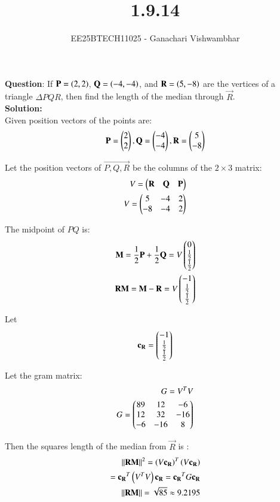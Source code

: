 \documentclass[journal]{IEEEtran}
\begin{document}
\title{1.9.14}
\author{EE25BTECH11025 - Ganachari Vishwambhar}
\maketitle

\textbf{Question}:\newline
If $\mathbf{P}=\left(2,2\right)$, $\mathbf{Q}=\left(-4,-4\right)$, and $\mathbf{R}=\left(5,-8\right)$ are the vertices of a triangle $\Delta PQR$, then find the length of the median through $\vec{R}$.\\
\textbf{Solution: }\\
Given position vectors of the points are:
\begin{align}
    \mathbf{P}=\begin{pmatrix}2\\2\end{pmatrix},
    \mathbf{Q}=\begin{pmatrix}-4\\-4\end{pmatrix},
    \mathbf{R}=\begin{pmatrix}5\\-8\end{pmatrix}
\end{align}

Let the position vectors of $\vec{P,Q,R}$ be the columns of the $2\times 3$ matrix:
\begin{align}
    V=\begin{pmatrix}\mathbf{R}&\mathbf{Q}&\mathbf{P}\end{pmatrix}\\
    V=\begin{pmatrix}5&-4&2\\-8&-4&2\end{pmatrix}
\end{align}

The midpoint of $PQ$ is:
\begin{align}
    \mathbf{M}=\frac{1}{2}\mathbf{P}+\frac{1}{2}\mathbf{Q}=V\begin{pmatrix}0\\ \frac{1}{2}\\ \frac{1}{2}\end{pmatrix}\\
    \mathbf{RM}=\mathbf{M}-\mathbf{R}=V\begin{pmatrix}-1\\ \frac{1}{2}\\ \frac{1}{2}\end{pmatrix}
\end{align}

Let
\begin{align}
    \mathbf{c_R}=\begin{pmatrix}-1\\ \frac{1}{2}\\ \frac{1}{2}\end{pmatrix}
\end{align}

Let the gram matrix:
\begin{align}
G=V^TV\\
G=\begin{pmatrix}89&12&-6\\12&32&-16\\-6&-16&8\end{pmatrix}
\end{align}


Then the squares length of the median from $\vec{R}$ is :
\begin{align}
    ||\mathbf{RM}||^2=\left(V\mathbf{c_R}\right)^T\left(V\mathbf{c_R}\right)\\
    =\mathbf{c_R}^T\left(V^TV\right)\mathbf{c_R}=\mathbf{c_R}^TG\mathbf{c_R}\\
    ||\mathbf{RM}||= \sqrt{85}\approx9.2195
\end{align}
\end{document}
